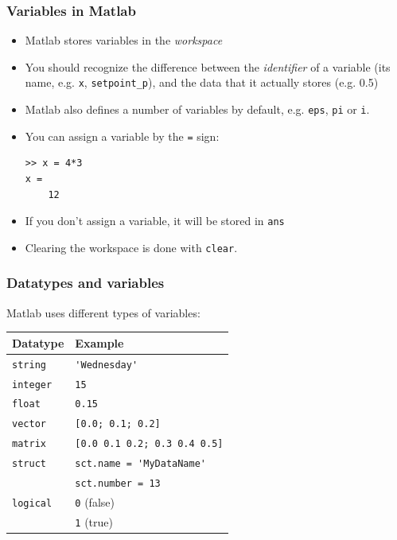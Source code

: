\documentclass[11pt,table,final,fleqn,xcolor={usenames,dvipsnames},unknownkeysallowed,handout]{beamer}
\begin{document}
\begin{frame}[fragile]
 \frametitle{Variables in Matlab}
  \begin{itemize}
   \item Matlab stores variables in the \emph{workspace}\pause
   \item You should recognize the difference between the \emph{identifier} of a variable (its name, e.g. \lstinline$x$, \lstinline$setpoint_p$), and the data that it actually stores (e.g. 0.5)\pause
   \item Matlab also defines a number of variables by default, e.g. \lstinline$eps$, \lstinline$pi$ or \lstinline$i$.\pause
   \item You can assign a variable by the \lstinline$=$ sign:
   \begin{lstlisting}
>> x = 4*3
x =
    12
   \end{lstlisting}\pause
   \item If you don't assign a variable, it will be stored in \lstinline$ans$
   \item Clearing the workspace is done with \lstinline$clear$.
 \end{itemize}
\end{frame}

\begin{frame}[fragile]
    \frametitle{Datatypes and variables}
    Matlab uses different types of variables:
        \begin{longtable}{l!{\vrule}l}
         Datatype        & Example \\ \hline
         \texttt{string} & \lstinline$'Wednesday'$ \\
         \texttt{integer}& \lstinline$15$ \\
         \texttt{float}  & \lstinline$0.15$ \\
         \texttt{vector} & \lstinline$[0.0; 0.1; 0.2]$ \\
         \texttt{matrix} & \lstinline$[0.0 0.1 0.2; 0.3 0.4 0.5]$ \\
         \texttt{struct} & \lstinline$sct.name = 'MyDataName'$ \\
                         & \lstinline$sct.number = 13$ \\
         \texttt{logical}& \lstinline$0$ (false)  \\
                         & \lstinline$1$ (true) \\
       \end{longtable}
   \end{frame}
   
\end{document}
